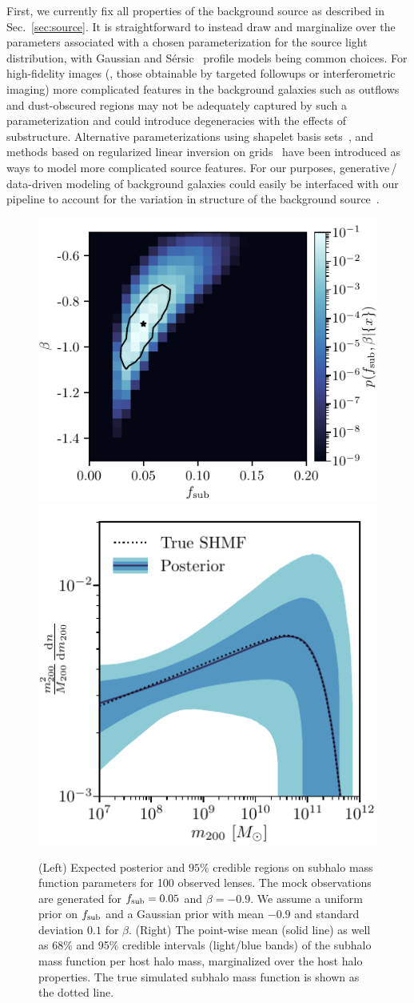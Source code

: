 \documentclass[twocolumn]{aastex62}
\begin{document}
First, we currently fix all properties of the background source as described in Sec.~\ref{sec:source}. It is straightforward to instead draw and marginalize over the parameters associated with a chosen parameterization for the source light distribution, with Gaussian and S\'{e}rsic~\citep{1963BAAA....6...41S} profile models being common choices. For high-fidelity images (\eg, those obtainable by targeted followups or interferometric imaging) more complicated features in the background galaxies such as outflows and dust-obscured regions may not be adequately captured by such a parameterization and could introduce degeneracies with the effects of substructure. Alternative parameterizations using shapelet basis sets~\citep{1803.09746, 1504.07629}, and methods based on regularized linear inversion on grids~\citep{1708.07377, astro-ph/0601493,2003ApJ...590..673W} have been introduced as ways to model more complicated source features. For our purposes, generative\,/\,data-driven modeling of background galaxies could easily be interfaced with our pipeline to account for the variation in structure of the background source~\citep{1901.01359}.

\begin{figure}
\centering
\includegraphics[height=0.4\textwidth]{figures/posterior}
\includegraphics[height=0.4\textwidth]{figures/shmf}
\caption{(Left) Expected posterior and $95\%$ credible regions on subhalo mass function parameters for 100 observed lenses. The mock observations are generated for $f_{\mathrm{sub}} = 0.05$ and $\beta = -0.9$. We assume a uniform prior on $f_{\mathrm{sub}}$ and a Gaussian prior with mean $-0.9$ and standard deviation $0.1$ for $\beta$. (Right) The point-wise mean (solid line) as well as 68\% and 95\% credible intervals (light/blue bands) of the subhalo mass function per host halo mass, marginalized over the host halo properties. The true simulated subhalo mass function is shown as the dotted line.}
\label{fig:bayesian_post}
\end{figure}
\end{document}
